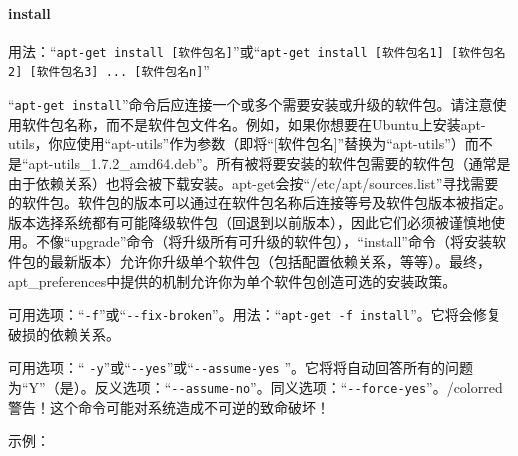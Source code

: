 \paragraph{install}
用法：“\verb|apt-get install [软件包名]|”或“\verb|apt-get install [软件包名1] [软件包名2] [软件包名3] ... [软件包名n]|”\par
“\verb|apt-get install|”命令后应连接一个或多个需要安装或升级的软件包。请注意使用软件包名称，而不是软件包文件名。例如，如果你想要在Ubuntu上安装apt-utils，你应使用“apt-utils”作为参数（即将“[软件包名]”替换为“apt-utils”）而不是“apt-utils\_1.7.2\_amd64.deb”。所有被将要安装的软件包需要的软件包（通常是由于依赖关系）也将会被下载安装。apt-get会按“/etc/apt/sources.list”寻找需要的软件包。软件包的版本可以通过在软件包名称后连接等号及软件包版本被指定。版本选择系统都有可能降级软件包（回退到以前版本），因此它们必须被谨慎地使用。不像“upgrade”命令（将升级所有可升级的软件包），“install”命令（将安装软件包的最新版本）允许你升级单个软件包（包括配置依赖关系，等等）。最终，apt\_preferences中提供的机制允许你为单个软件包创造可选的安装政策。\par
可用选项：“\verb|-f|”或“\verb|--fix-broken|”。用法：“\verb|apt-get -f install|”。它将会修复破损的依赖关系。\par
可用选项：“ \verb|-y|”或“\verb|--yes|”或“\verb|--assume-yes| ”。它将将自动回答所有的问题为“Y”（是）。反义选项：“\verb|--assume-no|”。同义选项：“\verb|--force-yes|”。{/color{red}警告！这个命令可能对系统造成不可逆的致命破坏！}\par
示例：
